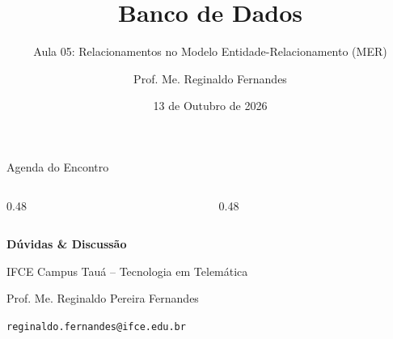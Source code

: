 \documentclass[aspectratio=169,utf8,t]{beamer}
\author{Prof. Me. Reginaldo Fernandes}
\institute{Instituto Federal do Ceará -- Campus Tauá \\ Tecnologia em Telemática}
\title{Banco de Dados}
\subtitle{Aula 05: Relacionamentos no Modelo Entidade-Relacionamento (MER)}
\date{13 de Outubro de 2026}
\begin{document}
\frame[plain]{\titlepage}

\begin{frame}{Agenda do Encontro}
  \vspace{0.2cm}
  \begin{columns}[t]
    \begin{column}{0.48\textwidth}
      \tableofcontents[sections={1-4}]
    \end{column}
    \begin{column}{0.48\textwidth}
      \tableofcontents[sections={5-9}]
    \end{column}
  \end{columns}
\end{frame}











\begin{frame}[plain]
  \vspace{2cm}
  \centering
  {\Huge \textbf{Dúvidas \& Discussão}}\par
  \vspace{0.8cm}
  {\large IFCE Campus Tauá -- Tecnologia em Telemática}\par
  \vspace{0.3cm}
  {\small Prof. Me. Reginaldo Pereira Fernandes}\par
  {\scriptsize \texttt{reginaldo.fernandes@ifce.edu.br}}
\end{frame}
\end{document}
